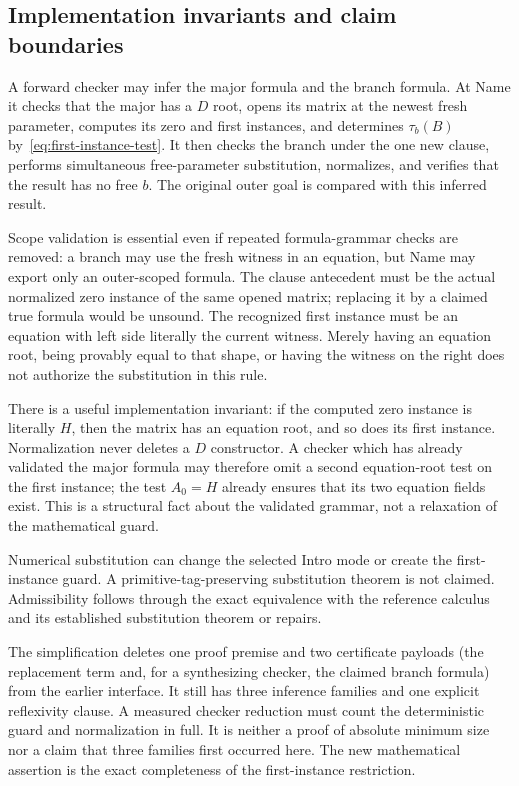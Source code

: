 \documentclass[11pt,a4paper]{article}
\theoremstyle{definition}\newtheorem{definition}[theorem]{Definition}
\theoremstyle{remark}\newtheorem{remark}[theorem]{Remark}
\begin{document}
\subsection{Implementation invariants and claim boundaries}

A forward checker may infer the major formula and the branch formula.
At Name it checks that the major has a $D$ root, opens its matrix at the
newest fresh parameter, computes its zero and first instances, and
determines $\tau_b(B)$ by~\eqref{eq:first-instance-test}. It then checks
the branch under the one new clause, performs simultaneous free-parameter
substitution, normalizes, and verifies that the result has no free $b$.
The original outer goal is compared with this inferred result.

Scope validation is essential even if repeated formula-grammar checks are
removed: a branch may use the fresh witness in an equation, but Name may
export only an outer-scoped formula. The clause antecedent must be the
actual normalized zero instance of the same opened matrix; replacing it
by a claimed true formula would be unsound. The recognized first instance
must be an equation with left side literally the current witness. Merely
having an equation root, being provably equal to that shape, or having the
witness on the right does not authorize the substitution in this rule.

There is a useful implementation invariant: if the computed zero instance
is literally $H$, then the matrix has an equation root, and so does its
first instance. Normalization never deletes a $D$ constructor. A checker
which has already validated the major formula may therefore omit a second
equation-root test on the first instance; the test $A_0=H$ already ensures
that its two equation fields exist. This is a structural fact about the
validated grammar, not a relaxation of the mathematical guard.

Numerical substitution can change the selected Intro mode or create the
first-instance guard. A primitive-tag-preserving substitution theorem is
not claimed. Admissibility follows through the exact equivalence with the
reference calculus and its established substitution theorem or repairs.

The simplification deletes one proof premise and two certificate payloads
(the replacement term and, for a synthesizing checker, the claimed branch
formula) from the earlier interface. It still has three inference families
and one explicit reflexivity clause. A measured checker reduction must
count the deterministic guard and normalization in full. It is neither a
proof of absolute minimum size nor a claim that three families first
occurred here. The new mathematical assertion is the exact completeness
of the first-instance restriction.
\end{document}
